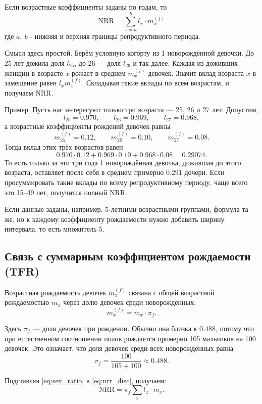 \documentclass[a4paper, 14pt]{extarticle}
\begin{document}
Если возрастные коэффициенты заданы по годам, то
\begin{equation}
\text{NRR} = \sum_{x=a}^{b} l_x \cdot m_x^{(f)}
\label{eq:nrr_disc_new}
\end{equation}
где $a, \ b$ - нижняя и верхняя границы репродуктивного периода.

Смысл здесь простой. Берём условную когорту из 1 новорождённой девочки. До 25 лет дожила доля $l_{25}$, до 26 --- доля $l_{26}$ и так далее. Каждая из доживших женщин в возрасте $x$ рожает в среднем $m_x^{(f)}$ девочек. Значит вклад возраста $x$ в замещение равен $l_x m_x^{(f)}$. Складывая такие вклады по всем возрастам, и получаем NRR.

Пример. Пусть нас интересуют только три возраста --- 25, 26 и 27 лет. Допустим,
\[
l_{25}=0.970,\qquad l_{26}=0.969,\qquad l_{27}=0.968,
\]
а возрастные коэффициенты рождений девочек равны
\[
m_{25}^{(f)}=0.12,\qquad m_{26}^{(f)}=0.10,\qquad m_{27}^{(f)}=0.08.
\]
Тогда вклад этих трёх возрастов равен
\[
0.970\cdot 0.12 + 0.969\cdot 0.10 + 0.968\cdot 0.08 = 0.29074.
\]
То есть только за эти три года 1 новорождённая девочка, дожившая до этого возраста, оставляет после себя в среднем примерно $0.291$ дочери. Если просуммировать такие вклады по всему репродуктивному периоду, чаще всего это 15--49 лет, получится полный NRR.

Если данные заданы, например, 5-летними возрастными группами, формула та же, но к каждому коэффициенту рождаемости нужно добавить ширину интервала, то есть множитель 5.



\subsection{Связь с суммарным коэффициентом рождаемости (TFR)}

Возрастная рождаемость девочек $m_x^{(f)}$ связана с общей возрастной рождаемостью $m_x$ через долю девочек среди новорождённых:
\begin{equation}
m_x^{(f)} = m_x \cdot \pi_f.
\label{eq:sex_ratio}
\end{equation}

Здесь $\pi_f$ --- доля девочек при рождении. Обычно она близка к $0.488$, потому что при естественном соотношении полов рождается примерно 105 мальчиков на 100 девочек. Это означает, что доля девочек среди всех новорождённых равна
\[
\pi_f=\frac{100}{105+100}\approx 0.488.
\]

Подставляя \eqref{eq:sex_ratio} в \eqref{eq:nrr_disc}, получаем:
\begin{equation}
\text{NRR} = \pi_f \sum_{x} l_x \cdot m_x.
\label{eq:nrr_pi}
\end{equation}
\end{document}
